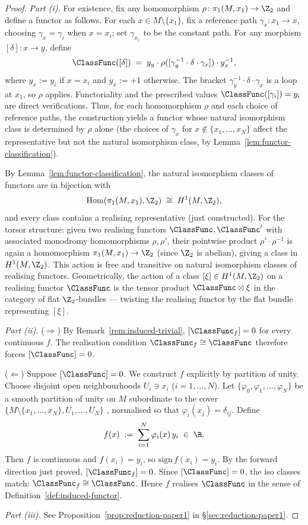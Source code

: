 \begin{proof}
\textit{Part (i).} For existence, fix any homomorphism
$\rho\colon\pi_1(M,x_1)\to\Z_2$ and define a functor as follows. For
each $x\in M\setminus\{x_1\}$, fix a reference path
$\gamma_x\colon x_1\to x$, choosing $\gamma_x=\gamma_i$ when $x=x_i$;
set $\gamma_{x_1}$ to be the constant path. For any morphism
$[\delta]\colon x\to y$, define
\[
   \ClassFunc([\delta]) \;=\;
   y_y \cdot \rho([\gamma_y^{-1}\cdot\delta\cdot\gamma_x])\cdot y_x^{-1},
\]
where $y_x:=y_i$ if $x=x_i$ and $y_x:=+1$ otherwise. The bracket
$\gamma_y^{-1}\cdot\delta\cdot\gamma_x$ is a loop at $x_1$, so $\rho$
applies. Functoriality and the prescribed values
$\ClassFunc([\gamma_i])=y_i$ are direct verifications. Thus, for each
homomorphism $\rho$ and each choice of reference paths, the
construction yields a functor whose natural isomorphism class is
determined by $\rho$ alone (the choices of $\gamma_x$ for $x\notin
\{x_1,\dots,x_N\}$ affect the representative but not the natural
isomorphism class, by Lemma~\ref{lem:functor-classification}).

By Lemma~\ref{lem:functor-classification}, the natural isomorphism
classes of functors are in bijection with
\[
   \mathrm{Hom}(\pi_1(M,x_1),\Z_2) \;\cong\; H^1(M,\Z_2),
\]
and every class contains a realising representative (just constructed).
For the torsor
structure: given two realising functors $\ClassFunc,\ClassFunc'$ with
associated monodromy homomorphisms $\rho,\rho'$, their pointwise
product $\rho'\cdot\rho^{-1}$ is again a homomorphism
$\pi_1(M,x_1)\to\Z_2$ (since $\Z_2$ is abelian), giving a class in
$H^1(M,\Z_2)$. This action is free and transitive on natural
isomorphism classes of realising functors. Geometrically, the action
of a class $[\xi]\in H^1(M,\Z_2)$ on a realising functor $\ClassFunc$
is the tensor product $\ClassFunc\otimes\xi$ in the category of flat
$\Z_2$-bundles --- twisting the realising functor by the flat bundle
representing $[\xi]$.

\textit{Part (ii).} ($\Rightarrow$) By Remark~\ref{rem:induced-trivial},
$[\ClassFunc_f]=0$ for every continuous $f$. The realisation condition
$\ClassFunc_f\cong\ClassFunc$ therefore forces $[\ClassFunc]=0$.

($\Leftarrow$) Suppose $[\ClassFunc]=0$. We construct $f$ explicitly
by partition of unity. Choose disjoint open neighbourhoods
$U_i\ni x_i$ ($i=1,\dots,N$). Let $\{\varphi_0,\varphi_1,\dots,
\varphi_N\}$ be a smooth partition of unity on $M$ subordinate to the
cover $\{M\setminus\{x_1,\dots,x_N\},U_1,\dots,U_N\}$
\cite[Theorem~2.13]{Lee}, normalised so
that $\varphi_i(x_j)=\delta_{ij}$. Define
\[
   f(x) \;:=\; \sum_{i=1}^N \varphi_i(x)\, y_i \;\in\;\R.
\]
Then $f$ is continuous and $f(x_i)=y_i$, so
$\mathrm{sign}\,f(x_i)=y_i$. By the forward direction just proved,
$[\ClassFunc_f]=0$. Since $[\ClassFunc]=0$, the iso classes match:
$\ClassFunc_f\cong\ClassFunc$. Hence $f$ realises $\ClassFunc$ in the
sense of Definition~\ref{def:induced-functor}.

\textit{Part (iii).} See Proposition~\ref{prop:reduction-paper1} in
\S\ref{sec:reduction-paper1}.
\end{proof}

